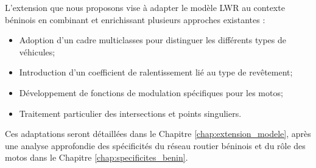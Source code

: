L'extension que nous proposons vise à adapter le modèle LWR au contexte béninois en combinant et enrichissant plusieurs approches existantes :

\begin{itemize}
\item Adoption d'un cadre multiclasses pour distinguer les différents types de véhicules;
\item Introduction d'un coefficient de ralentissement lié au type de revêtement;
\item Développement de fonctions de modulation spécifiques pour les motos;
\item Traitement particulier des intersections et points singuliers.
\end{itemize}

Ces adaptations seront détaillées dans le Chapitre \ref{chap:extension_modele}, après une analyse approfondie des spécificités du réseau routier béninois et du rôle des motos dans le Chapitre \ref{chap:specificites_benin}.
